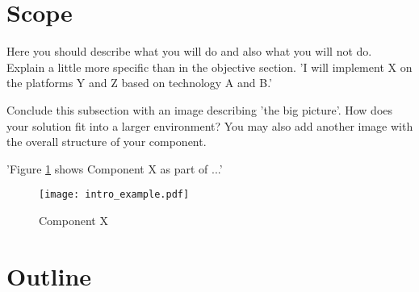 \section{Scope\label{sec:scope}}

Here you should describe what you will do and also what you will not do. Explain a little more specific than in the objective section. 'I will implement X on the platforms Y and Z based on technology A and B.'

Conclude this subsection with an image describing 'the big picture'. How does your solution fit into a larger environment? You may also add another image with the overall structure of your component.

'Figure \ref{fig:intro} shows Component X as part of ...' 
\\
\begin{figure}[htb]
  \centering
  \texttt{[image: intro\_example.pdf]}\\
  \caption{Component X}\label{fig:intro}
\end{figure}

\section{Outline\label{sec:outline}}

